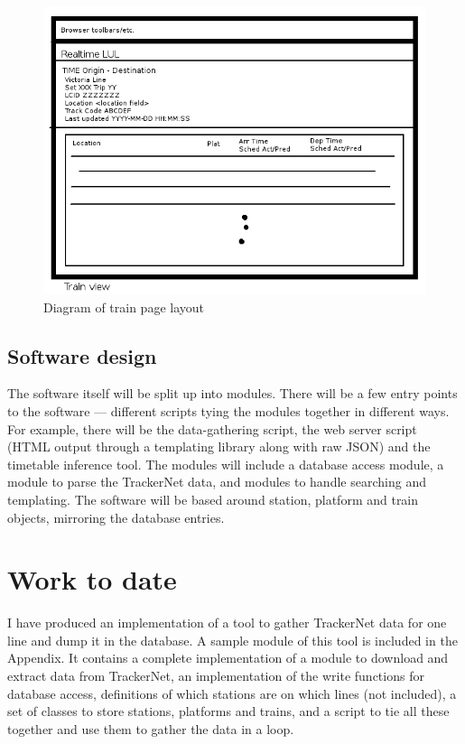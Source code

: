 \documentclass[a4paper,12pt]{article}
\begin{document}
\begin{figure}[h]
  \centering
  \includegraphics[width=\linewidth]{screen3}
  \caption{Diagram of train page layout}
  \label{fig:screen3}
\end{figure}

\subsection{Software design}

The software itself will be split up into modules. There will be a few entry
points to the software --- different scripts tying the modules together in
different ways. For example, there will be the data-gathering script, the web
server script (HTML output through a templating library along with raw JSON)
and the timetable inference tool. The modules will include a database access
module, a module to parse the TrackerNet data, and modules to handle searching
and templating. The software will be based around station, platform and train
objects, mirroring the database entries.

\section{Work to date}

I have produced an implementation of a tool to gather TrackerNet data for one
line and dump it in the database. A sample module of this tool is included in
the Appendix. It contains a complete implementation of a module to download and
extract data from TrackerNet, an implementation of the write functions for
database access, definitions of which stations are on which lines (not
included), a set of classes to store stations, platforms and trains, and a
script to tie all these together and use them to gather the data in a loop.
\end{document}
